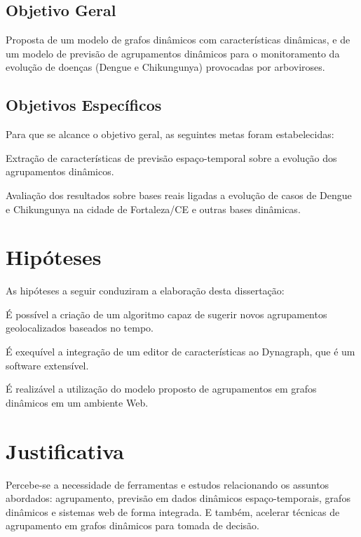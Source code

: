 \subsection{Objetivo Geral}

Proposta de um modelo de grafos dinâmicos com características dinâmicas, e de um modelo de previsão de agrupamentos dinâmicos para o monitoramento da evolução de doenças (Dengue e Chikungunya) provocadas por arboviroses.

\subsection{Objetivos Específicos}
\label{sec:objetivos-especificos}

Para que se alcance o objetivo geral, as seguintes metas foram estabelecidas:

\begin{alineas}
	\item Extração de características de previsão espaço-temporal sobre a evolução dos agrupamentos dinâmicos.
	\item Avaliação dos resultados sobre bases reais ligadas a evolução de casos de Dengue e Chikungunya na cidade de Fortaleza/CE e outras bases dinâmicas.
\end{alineas}

\section{Hipóteses}
As hipóteses a seguir conduziram a elaboração desta dissertação:
\begin{alineas}
	\item É possível a criação de um algoritmo capaz de sugerir novos agrupamentos geolocalizados baseados no tempo.
	\item É exequível a integração de um editor de características ao Dynagraph, que é um software extensível.
	\item É realizável a utilização do modelo proposto de agrupamentos em grafos dinâmicos em um ambiente Web.
\end{alineas}

\section{Justificativa}
Percebe-se a necessidade de ferramentas e estudos 
relacionando os assuntos abordados: agrupamento, previsão em dados
dinâmicos espaço-temporais, grafos dinâmicos e sistemas web de forma integrada.
E também, acelerar técnicas de agrupamento em grafos dinâmicos para tomada de decisão.

